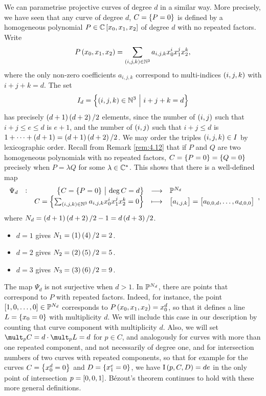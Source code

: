 We can parametrise projective curves of degree $ d $ in a similar way. More precisely, we have seen that any curve of degree $ d $, $ C = \cbr{P = 0} $ is defined by a homogeneous polynomial $ P \in \CC\sbr{x_0, x_1, x_2} $ of degree $ d $ with no repeated factors. Write
$$ P\br{x_0, x_1, x_2} = \sum_{\br{i, j, k} \in \NN^3} a_{i, j, k}x_0^ix_1^jx_2^k, $$
where the only non-zero coefficients $ a_{i, j, k} $ correspond to multi-indices $ \br{i, j, k} $ with $ i + j + k = d $. The set
$$ I_d = \cbr{\br{i, j, k} \in \NN^3 \st i + j + k = d} $$
has precisely $ \br{d + 1}\br{d + 2} / 2 $ elements, since the number of $ \br{i, j} $ such that $ i + j \le e \le d $ is $ e + 1 $, and the number of $ \br{i, j} $ such that $ i + j \le d $ is $ 1 + \dots + \br{d + 1} = \br{d + 1}\br{d + 2} / 2 $. We may order the triples $ \br{i, j, k} \in I $ by lexicographic order. Recall from Remark \ref{rem:4.12} that if $ P $ and $ Q $ are two homogeneous polynomials with no repeated factors, $ C = \cbr{P = 0} = \cbr{Q = 0} $ precisely when $ P = \lambda Q $ for some $ \lambda \in \mathbb{C}^* $. This shows that there is a well-defined map
$$ \function[\Psi_d]{\cbr{C = \cbr{P = 0} \st \deg C = d}}{\PP^{N_d}}{C = \cbr{\sum_{\br{i, j, k} \in \NN^3} a_{i, j, k}x_0^ix_1^jx_2^k = 0}}{\sbr{a_{i, j, k}} = \sbr{a_{0, 0, d}, \dots, a_{d, 0, 0}}}, $$
where $ N_d = \br{d + 1}\br{d + 2} / 2 - 1 = d\br{d + 3} / 2 $.

\pagebreak

\begin{example*}
\hfill
\begin{itemize}
\item $ d = 1 $ gives $ N_1 = \br{1}\br{4} / 2 = 2 $.
\item $ d = 2 $ gives $ N_2 = \br{2}\br{5} / 2 = 5 $.
\item $ d = 3 $ gives $ N_3 = \br{3}\br{6} / 2 = 9 $.
\end{itemize}
\end{example*}

\begin{remark}
The map $ \Psi_d $ is not surjective when $ d > 1 $. In $ \mathbb{P}^{N_d} $, there are points that correspond to $ P $ with repeated factors. Indeed, for instance, the point $ \sbr{1, 0, \dots, 0} \in \PP^{N_d} $ corresponds to $ P\br{x_0, x_1, x_2} = x_0^d $, so that it defines a line $ L = \cbr{x_0 = 0} $ with multiplicity $ d $. We will include this case in our description by counting that curve component with multiplicity $ d $. Also, we will set $ \mult_p C = d \cdot \mult_p L = d $ for $ p \in C $, and analogously for curves with more than one repeated component, and not necessarily of degree one, and for intersection numbers of two curves with repeated components, so that for example for the curves $ C = \cbr{x_0^d = 0} $ and $ D = \cbr{x_1^e = 0} $, we have $ \I\br{p, C, D} = de $ in the only point of intersection $ p = \sbr{0, 0, 1} $. B\'ezout's theorem continues to hold with these more general definitions.
\end{remark}

